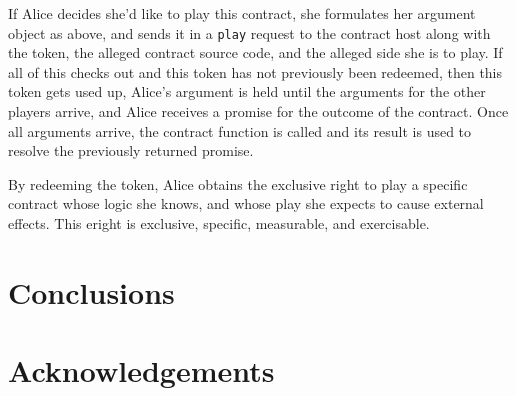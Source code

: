\documentclass{llncs}
\begin{document}
If Alice decides she'd like to play this contract, she formulates her argument object as above, and sends it in a {\tt play} request to the contract host along with the token, the alleged contract source code, and the alleged side she is to play. If all of this checks out and this token has not previously been redeemed, then this token gets used up, Alice's argument is held until the arguments for the other players arrive, and Alice receives a promise for the outcome of the contract. Once all arguments arrive, the contract function is called and its result is used to resolve the previously returned promise.

By redeeming the token, Alice obtains the exclusive right to play a specific contract whose logic she knows, and whose play she expects to cause external effects. This eright is exclusive, specific, measurable, and exercisable. 

\section{Conclusions}
\label{conclusions}


\section*{Acknowledgements}




% 

\end{document}
